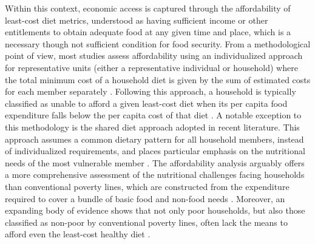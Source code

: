 \documentclass[Afour, sageh,times]{sagej}
\begin{document}
Within this context, economic access is captured through the affordability of least-cost diet metrics, understood as having sufficient income or other entitlements to obtain adequate food at any given time and place, which is a necessary though not sufficient condition for food security. From a methodological point of view, most studies assess affordability using an individualized approach for representative units (either a representative individual or household) where the total minimum cost of a household diet is given by the sum of estimated costs for each member separately \citep{Frega2012, Baldi2013, Biehl2016}. Following this approach, a household is typically classified as unable to afford a given least-cost diet when its per capita food expenditure falls below the per capita cost of that diet \citep{Geniez2014}. A notable exception to this methodology is the shared diet approach adopted in recent literature. This approach assumes a common dietary pattern for all household members, instead of individualized requirements, and places particular emphasis on the nutritional needs of the most vulnerable member \citep{Schneider2023}. The affordability analysis arguably offers a more comprehensive assessment of the nutritional challenges facing households than conventional poverty lines, which are constructed from the expenditure required to cover a bundle of basic food and non-food needs \citep{Ravallion2010}. Moreover, an expanding body of evidence shows that not only poor households, but also those classified as non-poor by conventional poverty lines, often lack the means to afford even the least-cost healthy diet \citep{Herforth2020, Herforth2022, Mahrt2022, Yoshioka2026}.

\smallskip
\end{document}
